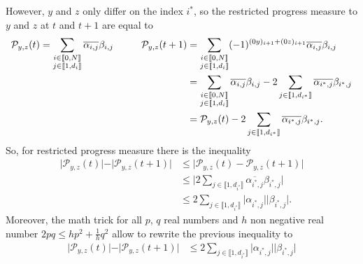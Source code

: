 \begin{appendix}
\begin{tproof}
        However, $y$ and $z$ only differ on the index $i^*$, so the restricted progress measure
        to $y$ and $z$ at $t$ and $t+1$ are equal to
        \begin{align*}
            \mathcal{P}_{y,z}(t) = \sum_{\substack{i \in \llbracket0,N\rrbracket                        \\j \in \llbracket1, d_i\rrbracket}} \overline{\alpha_{i,j}}\beta_{i,j} \hspace*{1cm}
            \mathcal{P}_{y,z}(t+1) & = \sum_{\substack{i \in \llbracket0,N\rrbracket                    \\j \in \llbracket1, d_i\rrbracket}} (-1)^{(0y)_{i+1}+(0z)_{i+1}} \overline{\alpha_{i,j}}\beta_{i,j} \\
                                   & = \sum_{\substack{i \in \llbracket0,N\rrbracket                    \\j \in \llbracket1, d_i\rrbracket}} \overline{\alpha_{i,j}}\beta_{i,j} -
            2\sum_{j\in\llbracket1,d_{i^*}\rrbracket} \overline{\alpha_{i^*,j}}\beta_{i^*,j}            \\
                                   & = \mathcal{P}_{y,z}(t) - 2\sum_{j\in\llbracket1,d_{i^*}\rrbracket}
            \overline{\alpha_{i^*,j}}\beta_{i^*,j}       .                                              \\
        \end{align*}
        So, for restricted progress measure there is the inequality
        \begin{align*}
            \vert \mathcal{P}_{y,z}(t)\vert - \vert \mathcal{P}_{y,z}(t+1)\vert & \leq \vert \mathcal{P}_{y,z}(t) - \mathcal{P}_{y,z}(t+1)\vert                                      \\
                                                                                & \leq \vert 2\sum_{j\in\llbracket1,d_{i^*}\rrbracket} \overline{\alpha_{i^*,j}}\beta_{i^*,j}  \vert \\
                                                                                & \leq 2\sum_{j\in\llbracket1,d_{i^*}\rrbracket} \vert\alpha_{i^*,j}\vert\vert\beta_{i^*,j}\vert.
        \end{align*}
        Moreover, the math trick for all $p$, $q$ real numbers and $h$ non negative real number
        $2pq \leq hp^2 + \frac{1}{h}q^2 $ allow to rewrite the previous inequality to
        \begin{align*}
            \vert \mathcal{P}_{y,z}(t)\vert - \vert \mathcal{P}_{y,z}(t+1)\vert & \leq 2\sum_{j\in\llbracket1,d_{i^*}\rrbracket}  \vert\alpha_{i^*,j}\vert\vert\beta_{i^*,j}\vert                                             \\

\end{align*}
\end{tproof}
\end{appendix}
